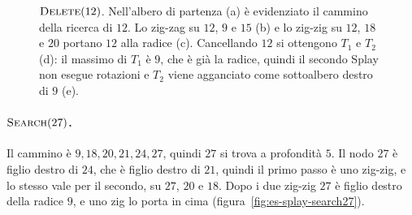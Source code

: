 \begin{figure}[htbp]
\caption{$\textsc{Delete}(12)$. Nell'albero di partenza (a) è evidenziato il cammino della ricerca di $12$. Lo zig-zag su $12$, $9$ e $15$ (b) e lo zig-zig su $12$, $18$ e $20$ portano $12$ alla radice (c). Cancellando $12$ si ottengono $T_1$ e $T_2$ (d): il massimo di $T_1$ è $9$, che è già la radice, quindi il secondo Splay non esegue rotazioni e $T_2$ viene agganciato come sottoalbero destro di $9$ (e).}
\label{fig:es-splay-delete12}
\end{figure}

\paragraph{$\textsc{Search}(27)$.}
Il cammino è $9, 18, 20, 21, 24, 27$, quindi $27$ si trova a profondità $5$. Il nodo $27$ è figlio destro di $24$, che è figlio destro di $21$, quindi il primo passo è uno zig-zig, e lo stesso vale per il secondo, su $27$, $20$ e $18$. Dopo i due zig-zig $27$ è figlio destro della radice $9$, e uno zig lo porta in cima (figura~\ref{fig:es-splay-search27}).

